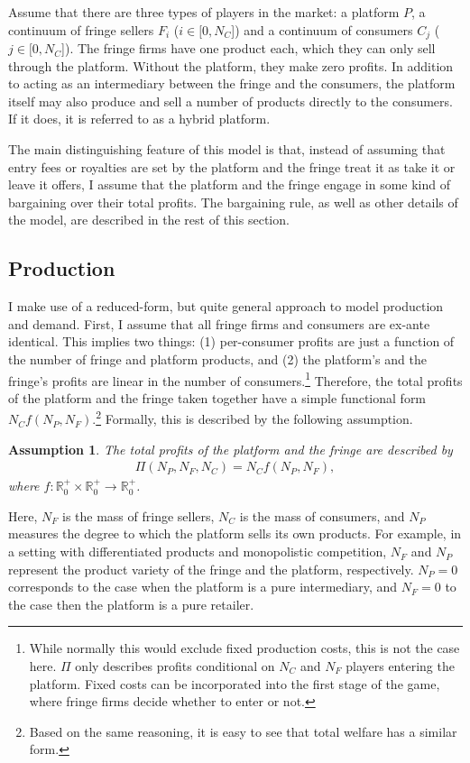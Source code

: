 \documentclass[a4paper]{article}
\newtheorem{assumption}{Assumption}
\begin{document}
Assume that there are three types of players in the market: a platform $P$, a continuum of fringe sellers $F_i$ ($i \in [0, N_C$]) and a continuum of consumers $C_j$ ($j \in [0, N_C$]).
The fringe firms have one product each, which they can only sell through the platform.
Without the platform, they make zero profits.
In addition to acting as an intermediary between the fringe and the consumers, the platform itself may also produce and sell a number of products directly to the consumers.
If it does, it is referred to as a hybrid platform.

The main distinguishing feature of this model is that, instead of assuming that entry fees or royalties are set by the platform and the fringe treat it as take it or leave it offers, I assume that the platform and the fringe engage in some kind of bargaining over their total profits.
The bargaining rule, as well as other details of the model, are described in the rest of this section.


\subsection{Production}

I make use of a reduced-form, but quite general approach to model production and demand.
First, I assume that all fringe firms and consumers are ex-ante identical.
This implies two things: (1) per-consumer profits are just a function of the number of fringe and platform products, and (2) the platform's and the fringe's profits are linear in the number of consumers.\footnote{
    While normally this would exclude fixed production costs, this is not the case here.
    $\Pi$ only describes profits conditional on $N_C$ and $N_F$ players entering the platform.
    Fixed costs can be incorporated into the first stage of the game, where fringe firms decide whether to enter or not.
}
Therefore, the total profits of the platform and the fringe taken together have a simple functional form $N_C f(N_P, N_F)$.\footnote{
    Based on the same reasoning, it is easy to see that total welfare has a similar form.
}
Formally, this is described by the following assumption.
\begin{assumption}
    \label{ass:identical_fringe}
    The total profits of the platform and the fringe are described by 
    \begin{align*}
        \Pi(N_P, N_F, N_C) = N_C f(N_P, N_F),
    \end{align*}
    where $f: \mathbb{R}^+_0 \times \mathbb{R}^+_0 \to \mathbb{R}^+_0$.
\end{assumption}
Here, $N_F$ is the mass of fringe sellers, $N_C$ is the mass of consumers, and $N_P$ measures the degree to which the platform sells its own products.
For example, in a setting with differentiated products and monopolistic competition, $N_F$ and $N_P$ represent the product variety of the fringe and the platform, respectively.
$N_P = 0$ corresponds to the case when the platform is a pure intermediary, and $N_F = 0$ to the case then the platform is a pure retailer.
\end{document}
